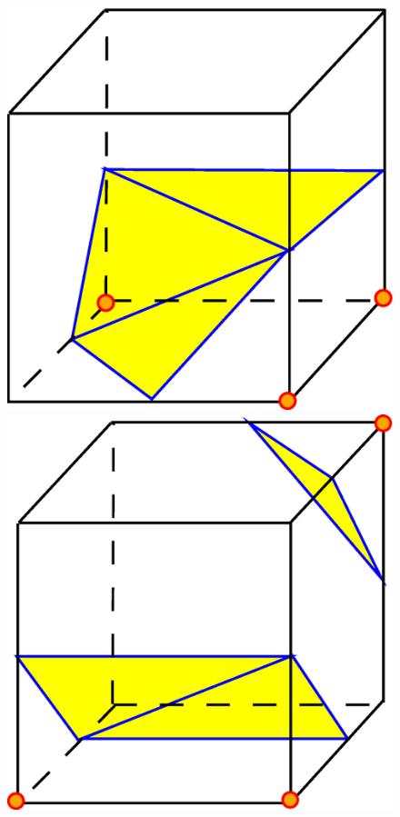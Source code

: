 \begin{figure}[ht]
\includegraphics[scale=0.15]{../img/mar_cub_case5.eps}
\includegraphics[scale=0.15]{../img/mar_cub_case6.eps}

\end{figure}
